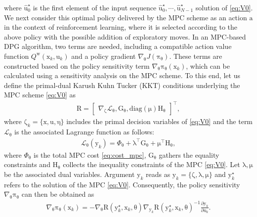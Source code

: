 \documentclass[10pt,twocolumn,twoside]{IEEEtran}
\newcommand{\vect}[1]{\ensuremath{\boldsymbol{\mathrm{#1}}}}
\begin{document}
where $\hat {\vect u}_0^{\star}$ is the first element of the input sequence $\hat {\vect u}_0^{\star},\cdots,\hat {\vect u}_{N-1}^{\star}$ solution of \eqref{eq:V0}. We next consider this optimal policy delivered by the MPC scheme as an action $\vect a$ in the context of reinforcement learning, where it is selected according to the above policy with the possible addition of exploratory moves. In an MPC-based DPG algorithm, two terms are needed, including a compatible action value function $Q^{\vect w}(\vect x_k,\vect u_k)$ and a policy gradient $\nabla_{\vect\theta} J\left(\vect\pi_{\vect\theta}\right)$. These terms are constructed based on the policy sensitivity term $\nabla_{\vect\theta}\vect\pi_{\vect\theta}\left(\vect x_k\right)$, which can be calculated using a sensitivity analysis on the MPC scheme. To this end, let us define the primal-dual Karush Kuhn Tucker (KKT) conditions underlying the MPC scheme \eqref{eq:V0} as 
\begin{align}
    \vect R = {\left[ {\begin{array}{*{20}{c}}
{{\nabla _{\vect \zeta}}{\mathcal L_{\vect\theta} }},{{\vect G_{\vect\theta} }},{\mathrm{diag}\left(\vect\mu\right) \vect H_{\vect\theta} }
\end{array}} \right]^\top},
\end{align}
where $\vect\zeta_k=\{\vect x,\vect u,\vect\eta\}$ includes the primal decision variables of \eqref{eq:V0} and the term $\mathcal{L}_{\vect \theta}$ is the associated Lagrange function as follows:
\begin{align}
\mathcal{L}_{\vect \theta}(\vect y_k) = \Phi_{\vect \theta} + \vect\lambda^\top \vect G_{\vect\theta}  + \vect\mu^\top \vect H_{\vect \theta},
\end{align}
where $\Phi_{\vect\theta}$ is the total MPC cost \eqref{eq:cost_mpc}, $\vect G_{\vect\theta}$ gathers the equality constraints and $\vect H_{\vect\theta}$ collects the inequality constraints of the MPC \eqref{eq:V0}. Let $\vect\lambda,\vect\mu$ be the associated dual variables. Argument ${\vect y_k}$ reads as ${\vect y_k} =\{\vect\zeta,\vect\lambda,\vect\mu\}$ and $ {\vect y}_k^{\star}$ refers to the solution of the MPC \eqref{eq:V0}. Consequently, the policy sensitivity ${\nabla _{\vect \theta} }{\vect \pi _{\vect \theta} }$ can then be obtained as \cite{10644368}
\begin{align}\label{eq:nabla_pi}
{\nabla _{\vect \theta} }{\vect \pi _{\vect \theta} }\left(\vect  x_k \right) =  - {\nabla _{\vect\theta} }{\vect R }\left( {\vect y_k^\star},\vect x_k,\vect\theta\right){\nabla _{\vect y_k}}{\vect R }{\left( {\vect y^\star_k},\vect x_k,\vect\theta \right)^{ - 1}}\frac{\partial {\vect y_k}}{\partial {\vect u_k}}.
\end{align}
\end{document}
